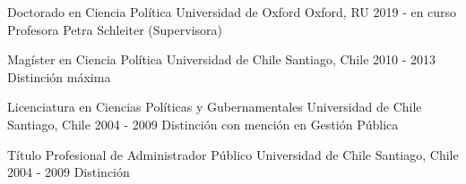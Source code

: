 





\begin{cventries}

\vspace{0.5mm}
\cventry
{Doctorado en Ciencia Política} 
{Universidad de Oxford} 
{Oxford, RU} 
{2019 - en curso} 
{Profesora Petra Schleiter (Supervisora)} \vspace{1.5mm}

\cventry
{Magíster en Ciencia Política} 
{Universidad de Chile} 
{Santiago, Chile} 
{2010 - 2013} 
{Distinción máxima} \vspace{1.5mm}

\cventry
{Licenciatura en Ciencias Políticas y Gubernamentales} 
{Universidad de Chile} 
{Santiago, Chile} 
{2004 - 2009} 
{Distinción con mención en Gestión Pública} \vspace{1.5mm}

\cventry
{Título Profesional de Administrador Público} 
{Universidad de Chile} 
{Santiago, Chile} 
{2004 - 2009} 
{Distinción}\vspace{1.5mm}

\end{cventries}
